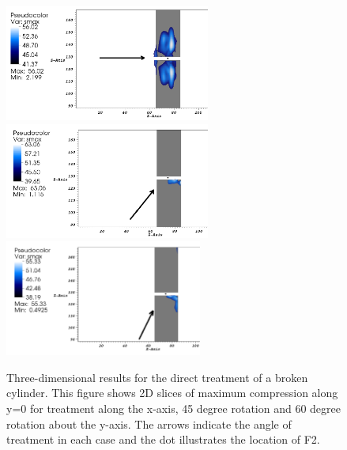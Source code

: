 \documentclass{article}
\begin{document}
\begin{figure}[h!]
\includegraphics[height=1.5in]{gapcylinder/gapcylinder_comp_90_blue_2D_new.png}
\includegraphics[height=1.5in]{gapcylinder/gapcylinder_comp_45_blue_2D_new.png} 
\includegraphics[height=1.5in]{gapcylinder/gapcylinder_comp_60_blue_2D_new.png}
\caption{Three-dimensional results for the direct treatment of a broken cylinder.  This figure shows 2D slices of maximum compression along y=0 for treatment along the x-axis, 45 degree rotation and 60 degree rotation about the y-axis.  The arrows indicate the angle of treatment in each case and the dot illustrates the location of F2.}
\label{fig:90gapcylin}
\end{figure}
\end{document}
